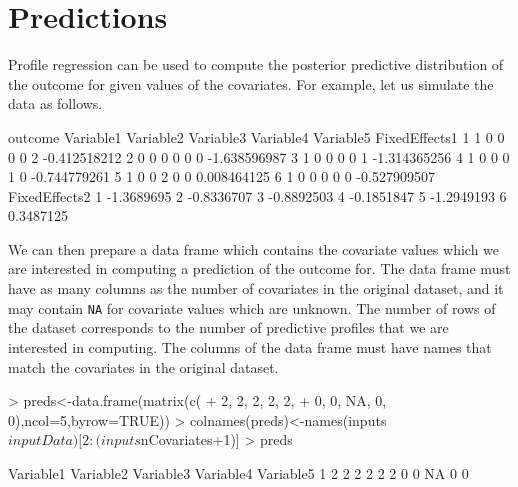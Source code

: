 \documentclass{article}
\begin{document}
\section{Predictions}
Profile regression can be used to compute the posterior predictive distribution of the outcome for given values of the covariates. For example, let us simulate the data as follows. 
\begin{Schunk}
\begin{Soutput}
  outcome Variable1 Variable2 Variable3 Variable4 Variable5 FixedEffects1
1       1         0         0         0         0         2  -0.412518212
2       0         0         0         0         0         0  -1.638596987
3       1         0         0         0         0         1  -1.314365256
4       1         0         0         0         1         0  -0.744779261
5       1         0         0         2         0         0   0.008464125
6       1         0         0         0         0         0  -0.527909507
  FixedEffects2
1    -1.3689695
2    -0.8336707
3    -0.8892503
4    -0.1851847
5    -1.2949193
6     0.3487125
\end{Soutput}
\end{Schunk}
We can then prepare a data frame which contains the covariate values which we are interested in computing a prediction of the outcome for. The data frame must have as many columns as the number of covariates in the original dataset, and it may contain \verb|NA| for covariate values which are unknown. The number of rows of the dataset corresponds to the number of predictive profiles that we are interested in computing. The columns of the data frame must have names that match the covariates in the original dataset.  
\begin{Schunk}
\begin{Sinput}
> preds<-data.frame(matrix(c(
+ 2, 2, 2, 2, 2,
+ 0, 0, NA, 0, 0),ncol=5,byrow=TRUE))
> colnames(preds)<-names(inputs$inputData)[2:(inputs$nCovariates+1)]
> preds
\end{Sinput}
\begin{Soutput}
  Variable1 Variable2 Variable3 Variable4 Variable5
1         2         2         2         2         2
2         0         0        NA         0         0
\end{Soutput}
\end{Schunk}
\end{document}
